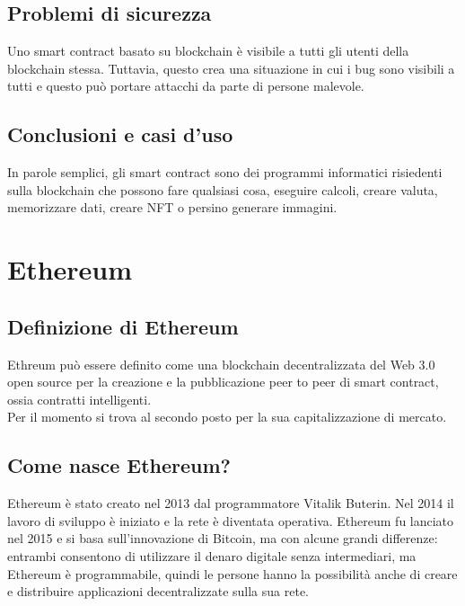 \documentclass[a4paper,11pt]{report}
\begin{document}
\section{Problemi di sicurezza}
Uno smart contract basato su blockchain è visibile a tutti gli utenti della blockchain stessa. Tuttavia, questo crea una situazione in cui i bug sono visibili a tutti e questo può portare attacchi da parte di persone malevole.

\section{Conclusioni e casi d'uso}
In parole semplici, gli smart contract sono dei programmi informatici risiedenti sulla blockchain che possono fare qualsiasi cosa, eseguire calcoli, creare valuta, memorizzare dati, creare NFT o persino generare immagini.

\chapter{Ethereum}
\section{Definizione di Ethereum}
Ethreum può essere definito come una blockchain decentralizzata del Web 3.0 open source per la creazione e la pubblicazione peer to peer di smart contract, ossia contratti intelligenti.\\
Per il momento si trova al secondo posto per la sua capitalizzazione di mercato.

\section{Come nasce Ethereum?}
Ethereum è stato creato nel 2013 dal programmatore Vitalik Buterin. Nel 2014 il lavoro di sviluppo è iniziato e la rete è diventata operativa.
Ethereum fu lanciato nel 2015 e si basa sull'innovazione di Bitcoin, ma con alcune grandi differenze: entrambi consentono di utilizzare il denaro digitale senza intermediari, ma Ethereum è programmabile, quindi le persone hanno la possibilità anche di creare e distribuire applicazioni decentralizzate sulla sua rete. 
\end{document}
